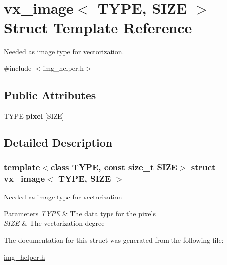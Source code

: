 \hypertarget{structvx__image}{}\section{vx\+\_\+image$<$ T\+Y\+PE, S\+I\+ZE $>$ Struct Template Reference}
\label{structvx__image}


Needed as image type for vectorization.  




{\ttfamily \#include $<$img\+\_\+helper.\+h$>$}

\subsection*{Public Attributes}
\begin{DoxyCompactItemize}
\item 
\mbox{\label{structvx__image_a82c37b41841a4c5018fcfc15aac32703}} 
T\+Y\+PE {\bfseries pixel} \mbox{[}S\+I\+ZE\mbox{]}
\end{DoxyCompactItemize}


\subsection{Detailed Description}
\subsubsection*{template$<$class T\+Y\+PE, const size\+\_\+t S\+I\+ZE$>$\newline
struct vx\+\_\+image$<$ T\+Y\+P\+E, S\+I\+Z\+E $>$}

Needed as image type for vectorization. 


\begin{DoxyParams}{Parameters}
{\em T\+Y\+PE} & The data type for the pixels \\
\hline
{\em S\+I\+ZE} & The vectorization degree \\
\hline
\end{DoxyParams}


The documentation for this struct was generated from the following file\+:\begin{DoxyCompactItemize}
\item 
\hyperlink{img__helper_8h}{img\+\_\+helper.\+h}\end{DoxyCompactItemize}
